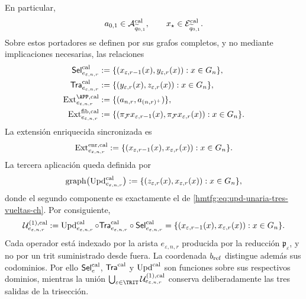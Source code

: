 En particular,
\[
 a_{0,1}\in\mathcal A^{\rm cal}_{\widetilde q_{0,1}},
 \qquad
 x_\star\in\mathcal E^{\rm cal}_{\widetilde q_{0,1}}.
\]
Sobre estos portadores se
definen por sus grafos completos, y no mediante implicaciones necesarias, las
relaciones
\begin{align}
 \mathsf{Sel}^{\rm cal}_{e_{\varepsilon,n,r}}
   &:=\{(x_{\varepsilon,r-1}(x),y_{\varepsilon,r}(x)):
          x\in G_n\},\\
 \mathsf{Tra}^{\rm cal}_{e_{\varepsilon,n,r}}
   &:=\{(y_{\varepsilon,r}(x),z_{\varepsilon,r}(x)):
          x\in G_n\},\\
 \operatorname{Ext}^{\APP,\rm cal}_{e_{\varepsilon,n,r}}
   &:=\{(a_{n,r},a_{(n,r)^+})\},
 \label{hmtfg:eq:ext-app-calibrada-ch}\\
 \operatorname{Ext}^{\rm fib,cal}_{e_{\varepsilon,n,r}}
   &:=\{(\pi_{\mathcal F}x_{\varepsilon,r-1}(x),
          \pi_{\mathcal F}x_{\varepsilon,r}(x)):x\in G_n\}.
 \label{hmtfg:eq:ext-fibra-calibrada-ch}
\end{align}
La extensión enriquecida sincronizada es
\begin{equation}
 \operatorname{Ext}^{\rm enr,cal}_{e_{\varepsilon,n,r}}
 :=\{(x_{\varepsilon,r-1}(x),x_{\varepsilon,r}(x)):
       x\in G_n\}.
 \label{hmtfg:eq:ext-enriquecida-calibrada-ch}
\end{equation}
La tercera aplicación queda definida por
\begin{equation}
 \operatorname{graph}
 \bigl(\operatorname{Upd}^{\rm cal}_{e_{\varepsilon,n,r}}\bigr)
 :=\{(z_{\varepsilon,r}(x),x_{\varepsilon,r}(x)):
       x\in G_n\},
 \label{hmtfg:eq:grafo-upd-calibrado-ch}
\end{equation}
donde el segundo componente es exactamente el de
\eqref{hmtfg:eq:upd-unaria-tres-vueltas-ch}. Por consiguiente,
\begin{equation}
 \mathcal U^{(1),\rm cal}_{e_{\varepsilon,n,r}}
 :=\operatorname{Upd}^{\rm cal}_{e_{\varepsilon,n,r}}\circ
   \mathsf{Tra}^{\rm cal}_{e_{\varepsilon,n,r}}\circ
   \mathsf{Sel}^{\rm cal}_{e_{\varepsilon,n,r}}
 =\{(x_{\varepsilon,r-1}(x),x_{\varepsilon,r}(x)):
      x\in G_n\}.
 \label{hmtfg:eq:transicion-cal-en-tpk-ch}
\end{equation}
Cada operador está indexado por la arista
\(e_{\varepsilon,n,r}\) producida por la reducción
\(\mathfrak p_\varepsilon\), y no por un trit suministrado desde fuera. La
coordenada \(b_{\rm ref}\) distingue además sus codominios. Por ello
\(\mathsf{Sel}^{\rm cal}_{e}\),
\(\mathsf{Tra}^{\rm cal}\) y \(\operatorname{Upd}^{\rm cal}\) son funciones
sobre sus respectivos dominios, mientras
la unión
\(\bigcup_{\varepsilon\in\TRIT}
\mathcal U^{(1),\rm cal}_{e_{\varepsilon,n,r}}\) conserva deliberadamente
las tres salidas de la trisección.


